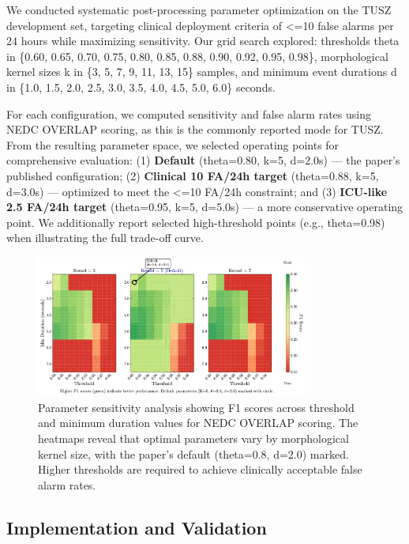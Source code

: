 \documentclass[
]{article}
\begin{document}
We conducted systematic post-processing parameter optimization on the
TUSZ development set, targeting clinical deployment criteria of
\textless=10 false alarms per 24 hours while maximizing sensitivity. Our
grid search explored: thresholds theta in \{0.60, 0.65, 0.70, 0.75,
0.80, 0.85, 0.88, 0.90, 0.92, 0.95, 0.98\}, morphological kernel sizes k
in \{3, 5, 7, 9, 11, 13, 15\} samples, and minimum event durations d in
\{1.0, 1.5, 2.0, 2.5, 3.0, 3.5, 4.0, 4.5, 5.0, 6.0\} seconds.

For each configuration, we computed sensitivity and false alarm rates
using NEDC OVERLAP scoring, as this is the commonly reported mode for
TUSZ. From the resulting parameter space, we selected operating points
for comprehensive evaluation: (1) \textbf{Default} (theta=0.80, k=5,
d=2.0s) --- the paper's published configuration; (2) \textbf{Clinical 10
FA/24h target} (theta=0.88, k=5, d=3.0s) --- optimized to meet the
\textless=10 FA/24h constraint; and (3) \textbf{ICU-like 2.5 FA/24h
target} (theta=0.95, k=5, d=5.0s) --- a more conservative operating
point. We additionally report selected high-threshold points (e.g.,
theta=0.98) when illustrating the full trade-off curve.

\begin{figure}
\hypertarget{fig:parameter-heatmap}{%
\centering
\includegraphics[width=0.8\textwidth,height=\textheight]{figures/output/arxiv/FIGURE_3_parameter_heatmap.pdf}
\caption{Parameter sensitivity analysis showing F1 scores across
threshold and minimum duration values for NEDC OVERLAP scoring. The
heatmaps reveal that optimal parameters vary by morphological kernel
size, with the paper's default (theta=0.8, d=2.0) marked. Higher
thresholds are required to achieve clinically acceptable false alarm
rates.}\label{fig:parameter-heatmap}
}
\end{figure}

\hypertarget{implementation-and-validation}{%
\subsection{Implementation and
Validation}\label{implementation-and-validation}}
\end{document}
